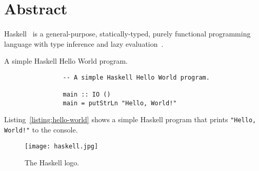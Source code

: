 \documentclass[main.tex]{subfiles}
\begin{document}
\section*{Abstract}
    \paragraph{}
        Haskell~\cite{haskell} is a general-purpose, statically-typed, purely
            functional programming language with type inference and lazy
            evaluation~\cite{wiki-haskell}.

        \begin{listing}[H]
            \caption{A simple Haskell Hello World program.}
            \begin{verbatim}
                -- A simple Haskell Hello World program.
                
                main :: IO ()
                main = putStrLn "Hello, World!"
            \end{verbatim}
            \label{listing:hello-world}
        \end{listing}

        Listing~\ref{listing:hello-world} shows a simple Haskell program that prints
            \verb|"Hello, World!"| to the console.

        \begin{figure}[H]
            \centering
            \texttt{[image: haskell.jpg]}
            \caption{The Haskell logo.}
            \label{fig:haskell-logo}
        \end{figure}
\end{document}
